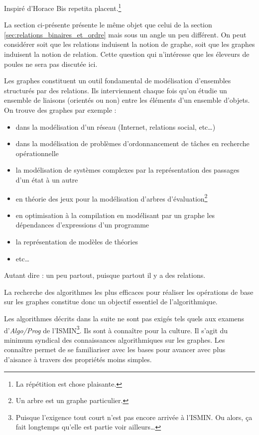 \documentclass[../../../main.tex]{subfiles}
\begin{document}
\begin{chapquote}{Inspiré d'Horace}
Bis repetita placent.\footnote{La répétition est chose plaisante.}
\end{chapquote}
La section ci-présente présente le même objet que celui de la section \ref{sec:relations_binaires_et_ordre} mais sous un angle un peu différent. On peut considérer soit que les relations induisent la notion de graphe, soit que les graphes induisent la notion de relation. Cette question qui n'intéresse que les éleveurs de poules ne sera pas discutée ici.

Les graphes constituent un outil fondamental de modélisation d'ensembles structurés par des relations. Ils interviennent chaque fois qu'on étudie un ensemble de liaisons (orientés ou non) entre les éléments d'un ensemble d'objets. On trouve des graphes par exemple :
\begin{itemize}
	\item dans la modélisation d'un réseau (Internet, relations social, etc\dots)
	\item dans la modélisation de problèmes d'ordonnancement de tâches en recherche opérationnelle
	\item la modélisation de systèmes complexes par la représentation des passages d'un état à un autre
	\item en théorie des jeux pour la modélisation d'arbres d'évaluation\footnote{Un arbre est un graphe particulier.}
	\item en optimisation à la compilation en modélisant par un graphe les dépendances d'expressions d'un programme
	\item la représentation de modèles de théories
	\item etc\dots
\end{itemize}
Autant dire : un peu partout, puisque partout il y a des relations.

La recherche des algorithmes les plus efficaces pour réaliser les opérations de base sur les graphes constitue donc un objectif essentiel de l’algorithmique.

Les algorithmes décrits dans la suite ne sont pas exigés tels quels aux examens d'\textit{Algo/Prog} de l'ISMIN\footnote{Puisque l'exigence tout court n'est pas encore arrivée à l'ISMIN. Ou alors, ça fait longtemps qu'elle est partie voir ailleurs\dots}. Ils sont à connaître pour la culture. Il s'agit du minimum syndical des connaissances algorithmiques sur les graphes. Les connaître permet de se familiariser avec les bases pour avancer avec plus d'aisance à travers des propriétés moins simples.
\end{document}
